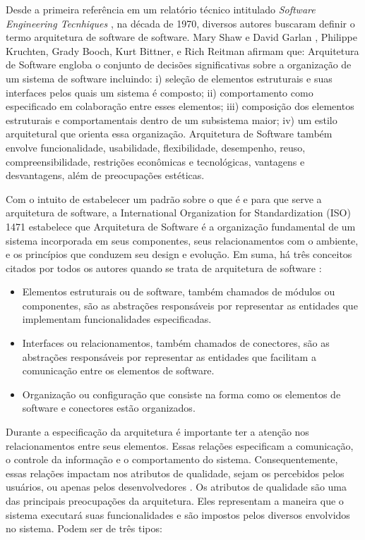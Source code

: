 Desde a primeira referência em um relatório técnico intitulado \textit{Software Engineering Tecnhiques} \cite{buxton1970software}, na década de 1970, diversos autores buscaram definir o termo arquitetura de software de software.
%
Mary Shaw e David Garlan \cite{shaw1996software}, Philippe Kruchten, Grady Booch, Kurt Bittner, e Rich Reitman afirmam que: Arquitetura de Software engloba o conjunto de decisões significativas sobre a organização de um sistema de software incluindo: i) seleção de elementos estruturais e suas interfaces pelos quais um sistema é composto; ii) comportamento como especificado em colaboração entre esses elementos; iii) composição dos elementos estruturais e comportamentais dentro de um subsistema maior; iv) um estilo arquitetural que orienta essa organização. Arquitetura de Software também envolve funcionalidade, usabilidade, flexibilidade, desempenho, reuso, compreensibilidade, restrições econômicas e tecnológicas, vantagens e desvantagens, além de preocupações estéticas.

Com o intuito de estabelecer um padrão sobre o que é e para que serve a arquitetura de software, a International Organization for Standardization (ISO) 1471 estabelece que Arquitetura de Software é a organização fundamental de um sistema incorporada em seus componentes, seus relacionamentos com o ambiente, e os princípios que conduzem seu design e evolução.
Em suma, há três conceitos citados por todos os autores quando se trata de arquitetura de software \cite{dias2000software}:

\begin{itemize}
\item Elementos estruturais ou de software, também chamados de módulos ou componentes, são as abstrações responsáveis por representar as entidades que implementam funcionalidades especificadas.
\item Interfaces ou relacionamentos, também chamados de conectores, são as abstrações responsáveis por representar as entidades que facilitam a comunicação entre os elementos de software.
\item Organização ou configuração que consiste na forma como os elementos de software e conectores estão organizados.
\end{itemize}

Durante a especificação da arquitetura é importante ter a atenção nos relacionamentos entre seus elementos. Essas relações especificam a comunicação, o controle da informação e o comportamento do sistema. Consequentemente, essas relações impactam nos atributos de qualidade, sejam os percebidos pelos usuários, ou apenas pelos desenvolvedores \cite{germoglio2010fundamentos}.
%
Os atributos de qualidade são uma das principais preocupações da arquitetura. Eles representam a maneira que o sistema executará suas funcionalidades e são impostos pelos diversos envolvidos no sistema. Podem ser de três tipos:

